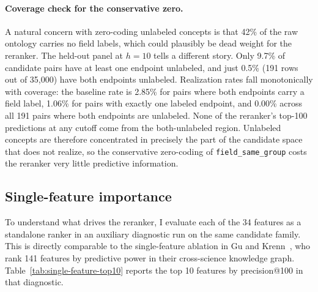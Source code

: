 \documentclass[11pt]{article}
\begin{document}
\paragraph{Coverage check for the conservative zero.} A natural concern with zero-coding unlabeled concepts is that 42\% of the raw ontology carries no field labels, which could plausibly be dead weight for the reranker. The held-out panel at $h=10$ tells a different story. Only 9.7\% of candidate pairs have at least one endpoint unlabeled, and just 0.5\% (191 rows out of 35{,}000) have both endpoints unlabeled. Realization rates fall monotonically with coverage: the baseline rate is 2.85\% for pairs where both endpoints carry a field label, 1.06\% for pairs with exactly one labeled endpoint, and 0.00\% across all 191 pairs where both endpoints are unlabeled. None of the reranker's top-100 predictions at any cutoff come from the both-unlabeled region. Unlabeled concepts are therefore concentrated in precisely the part of the candidate space that does not realize, so the conservative zero-coding of \texttt{field\_same\_group} costs the reranker very little predictive information.

\subsection{Single-feature importance}

To understand what drives the reranker, I evaluate each of the 34 features as a standalone ranker in an auxiliary diagnostic run on the same candidate family. This is directly comparable to the single-feature ablation in Gu and Krenn~\citeyearpar{gu2025impact4cast}, who rank 141 features by predictive power in their cross-science knowledge graph. Table~\ref{tab:single-feature-top10} reports the top 10 features by precision@100 in that diagnostic.
\end{document}
